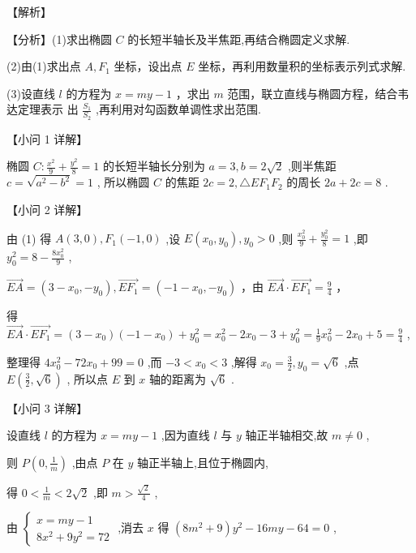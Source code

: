 \documentclass[10pt]{article}
\begin{document}
【解析】

【分析】(1)求出椭圆 \(C\) 的长短半轴长及半焦距,再结合椭圆定义求解.

(2)由(1)求出点 \(A,{F}_{1}\) 坐标，设出点 \(E\) 坐标，再利用数量积的坐标表示列式求解.

(3)设直线 \(l\) 的方程为 \(x = {my} - 1\) ，求出 \(m\) 范围，联立直线与椭圆方程，结合韦达定理表示 出 \(\frac{{S}_{1}}{{S}_{2}}\) ,再利用对勾函数单调性求出范围.

【小问 1 详解】

椭圆 \(C : \frac{{x}^{2}}{9} + \frac{{y}^{2}}{8} = 1\) 的长短半轴长分别为 \(a = 3,b = 2\sqrt{2}\) ,则半焦距 \(c = \sqrt{{a}^{2} - {b}^{2}} = 1\) , 所以椭圆 \(C\) 的焦距 \({2c} = 2,\bigtriangleup E{F}_{1}{F}_{2}\) 的周长 \({2a} + {2c} = 8\) .

【小问 2 详解】

由 (1) 得 \(A\left( {3,0}\right) ,{F}_{1}\left( {-1,0}\right)\) ,设 \(E\left( {{x}_{0},{y}_{0}}\right) ,{y}_{0} > 0\) ,则 \(\frac{{x}_{0}^{2}}{9} + \frac{{y}_{0}^{2}}{8} = 1\) ,即 \({y}_{0}^{2} = 8 - \frac{8{x}_{0}^{2}}{9}\) ,

\(\overrightarrow{EA} = \left( {3 - {x}_{0}, - {y}_{0}}\right) ,\overrightarrow{E{F}_{1}} = \left( {-1 - {x}_{0}, - {y}_{0}}\right)\) ，由 \(\overrightarrow{EA} \cdot  \overrightarrow{E{F}_{1}} = \frac{9}{4}\) ，

得 \(\overrightarrow{EA} \cdot  \overrightarrow{E{F}_{1}} = \left( {3 - {x}_{0}}\right) \left( {-1 - {x}_{0}}\right)  + {y}_{0}^{2} = {x}_{0}^{2} - 2{x}_{0} - 3 + {y}_{0}^{2} = \frac{1}{9}{x}_{0}^{2} - 2{x}_{0} + 5 = \frac{9}{4}\) ,

整理得 \(4{x}_{0}^{2} - {72}{x}_{0} + {99} = 0\) ,而 \(- 3 < {x}_{0} < 3\) ,解得 \({x}_{0} = \frac{3}{2},{y}_{0} = \sqrt{6}\) ,点 \(E\left( {\frac{3}{2},\sqrt{6}}\right)\) , 所以点 \(E\) 到 \(x\) 轴的距离为 \(\sqrt{6}\) .

【小问 3 详解】

设直线 \(l\) 的方程为 \(x = {my} - 1\) ,因为直线 \(l\) 与 \(y\) 轴正半轴相交,故 \(m \neq  0\) ,

则 \(P\left( {0,\frac{1}{m}}\right)\) ,由点 \(P\) 在 \(y\) 轴正半轴上,且位于椭圆内,

得 \(0 < \frac{1}{m} < 2\sqrt{2}\) ,即 \(m > \frac{\sqrt{2}}{4}\) ,

由 \(\left\{  \begin{array}{l} x = {my} - 1 \\  8{x}^{2} + 9{y}^{2} = {72} \end{array}\right.\) ,消去 \(x\) 得 \(\left( {8{m}^{2} + 9}\right) {y}^{2} - {16my} - {64} = 0\) ,
\end{document}
